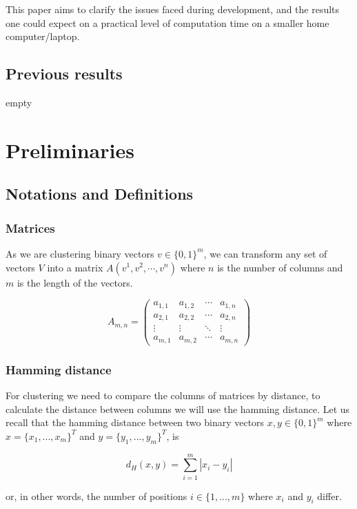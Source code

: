\documentclass[a4paper]{article}
\begin{document}
This paper aims to clarify the issues faced during development, and the results one could expect
on a practical level of computation time on a smaller home computer/laptop.

\subsection{Previous results}
empty

%
%
\newpage

\section{Preliminaries}
\subsection{Notations and Definitions}
\subsubsection{Matrices}
As we are clustering binary vectors $v \in \{0,1\}^m$, we can transform any set of vectors
$V$ into a matrix $A(v^1, v^2, \cdots, v^n)$ where $n$ is the number of columns
and $m$ is the length of the vectors.

\[
    A_{m,n} =
    \begin{pmatrix}
        a_{1,1} & a_{1,2} & \cdots & a_{1,n} \\
        a_{2,1} & a_{2,2} & \cdots & a_{2,n} \\
        \vdots  & \vdots  & \ddots & \vdots  \\
        a_{m,1} & a_{m,2} & \cdots & a_{m,n}
    \end{pmatrix}
\]

\subsubsection{Hamming distance}
For clustering we need to compare the columns of matrices by distance, to calculate the distance
between columns we will use the hamming distance. Let us recall that the hamming distance
between two binary vectors $x,y \in \{0,1\}^m$ where $x=\{x_1,...,x_m\}^T$ and
$y=\{y_1,...,y_m\}^T$, is

\[
    d_H(x,y)= \sum_{i = 1}^{m} |x_i - y_i|
\]

or, in other words, the number of positions $i \in \{1,...,m\}$ where $x_i$ and $y_i$ differ.
\end{document}
